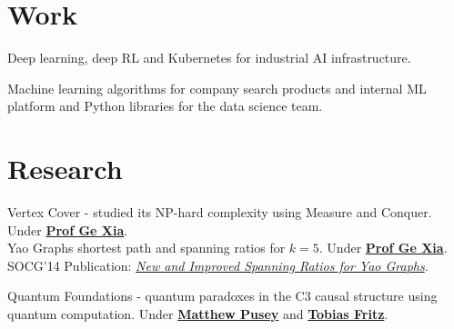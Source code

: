 \documentclass{deedy-resume-openfont}
\begin{document}
\begin{minipage}[t]{0.66\textwidth}


\section{Work}
Deep learning, deep RL and Kubernetes for industrial AI infrastructure.
\sectionsep

Machine learning algorithms for company search products and internal ML platform and Python libraries for the data science team.
\sectionsep




\section{Research}
Vertex Cover - studied its NP-hard complexity using Measure and Conquer. Under \textbf{\href{http://www.cs.lafayette.edu/~gexia/}{Prof Ge Xia}}. \\
\sectionsep
{}
Yao Graphs shortest path and spanning ratios for $k=5$. Under \textbf{\href{http://www.cs.lafayette.edu/~gexia/}{Prof Ge Xia}}. SOCG'14 Publication: \textit{\href{https://arxiv.org/abs/1307.5829}{New and Improved Spanning Ratios for Yao Graphs}}.
\sectionsep

Quantum Foundations - quantum paradoxes in the C3 causal structure using quantum computation. Under \textbf{\href{https://www.mattpusey.uk/}{Matthew Pusey}} and \textbf{\href{http://perimeterinstitute.ca/personal/tfritz/}{Tobias Fritz}}.
\sectionsep


\end{minipage}
\end{document}
